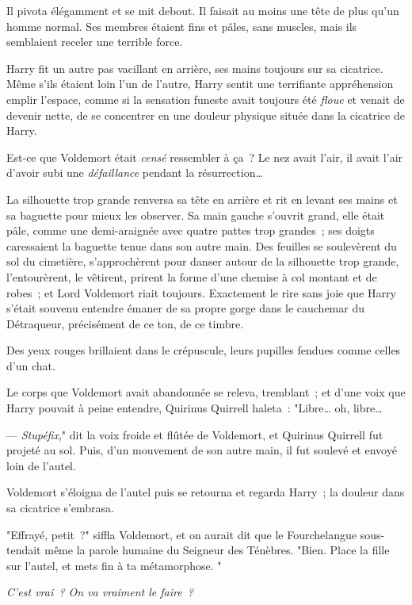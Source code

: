 Il pivota élégamment et se mit debout. Il faisait au moins une tête de plus qu'un homme normal. Ses membres étaient fins et pâles, sans muscles, mais ils semblaient receler une terrible force.

Harry fit un autre pas vacillant en arrière, ses mains toujours sur sa cicatrice. Même s'ils étaient loin l'un de l'autre, Harry sentit une terrifiante appréhension emplir l'espace, comme si la sensation funeste avait toujours été \emph{floue} et venait de devenir nette, de se concentrer en une douleur physique située dans la cicatrice de Harry.

Est-ce que Voldemort était \emph{censé} ressembler à ça~? Le nez avait l'air, il avait l'air d'avoir subi une \emph{défaillance} pendant la résurrection…

La silhouette trop grande renversa sa tête en arrière et rit en levant ses mains et sa baguette pour mieux les observer. Sa main gauche s'ouvrit grand, elle était pâle, comme une demi-araignée avec quatre pattes trop grandes~; ses doigts caressaient la baguette tenue dans son autre main. Des feuilles se soulevèrent du sol du cimetière, s'approchèrent pour danser autour de la silhouette trop grande, l'entourèrent, le vêtirent, prirent la forme d'une chemise à col montant et de robes~; et Lord Voldemort riait toujours. Exactement le rire sans joie que Harry s'était souvenu entendre émaner de sa propre gorge dans le cauchemar du Détraqueur, précisément de ce ton, de ce timbre.

Des yeux rouges brillaient dans le crépuscule, leurs pupilles fendues comme celles d'un chat.

Le corps que Voldemort avait abandonnée se releva, tremblant~; et d'une voix que Harry pouvait à peine entendre, Quirinus Quirrell haleta~: "Libre… oh, libre…

--- \emph{Stupéfix}," dit la voix froide et flûtée de Voldemort, et Quirinus Quirrell fut projeté au sol. Puis, d'un mouvement de son autre main, il fut soulevé et envoyé loin de l'autel.

Voldemort s'éloigna de l'autel puis se retourna et regarda Harry~; la douleur dans sa cicatrice s'embrasa.

"Effrayé, petit~?" siffla Voldemort, et on aurait dit que le Fourchelangue sous-tendait même la parole humaine du Seigneur des Ténèbres. "Bien. Place la fille sur l'autel, et mets fin à ta métamorphose. "

\emph{C'est vrai~? On va vraiment le faire~?}

